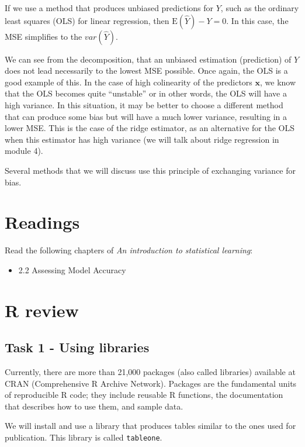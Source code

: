 \documentclass[
]{book}
\providecommand{\tightlist}{%
  \setlength{\itemsep}{0pt}\setlength{\parskip}{0pt}}
\begin{document}
If we use a method that produces unbiased predictions for \(Y\), such as the
ordinary least squares (OLS) for linear regression, then \(\mathrm{E}(\hat{Y}) - Y =0\).
In this case, the MSE simplifies to the \(var(\hat{Y})\).

We can see from the
decomposition, that an unbiased estimation (prediction) of \(Y\) does not lead
necessarily to the lowest MSE possible. Once again, the OLS is a good example of
this. In the case of high colinearity of the predictors \(\mathbf x\), we know that
the OLS becomes quite ``unstable'' or in other words, the OLS will have a high
variance. In this situation, it may be better to choose a different method
that can produce some bias but will have a much lower variance, resulting in a
lower MSE. This is the case of the ridge estimator, as an alternative for the OLS when this estimator has high variance (we will talk about ridge regression in module 4).

Several methods that we will discuss use this principle of exchanging variance
for bias.

\section{Readings}\label{maccuracy.read}

Read the following chapters of \emph{An introduction to statistical learning}:

\begin{itemize}
\tightlist
\item
  2.2 Assessing Model Accuracy
\end{itemize}

\section{R review}\label{R.02}

\subsection{Task 1 - Using libraries}\label{task-1---using-libraries}

Currently, there are more than 21,000 packages (also called libraries)
available at CRAN (Comprehensive R Archive Network). Packages are the
fundamental units of reproducible R code; they include reusable
R functions, the documentation that describes how to use them, and sample data.

We will install and use a library that produces tables similar to the ones used
for publication. This library is called \texttt{tableone}.
\end{document}
